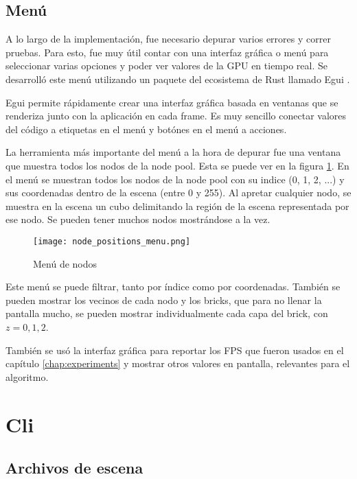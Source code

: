 
\subsection{Menú}

A lo largo de la implementación, fue necesario depurar varios errores y correr pruebas.
Para esto, fue muy útil contar con una interfaz gráfica o menú para seleccionar varias opciones y poder ver valores de la GPU en tiempo real.
Se desarrolló este menú utilizando un paquete del ecosistema de Rust llamado Egui \cite{egui}.

Egui permite rápidamente crear una interfaz gráfica basada en ventanas que se renderiza junto con la aplicación en cada frame.
Es muy sencillo conectar valores del código a etiquetas en el menú y botónes en el menú a acciones.

La herramienta más importante del menú a la hora de depurar fue una ventana que muestra todos los nodos de la node pool.
Esta se puede ver en la figura \ref{fig:node_positions_menu}.
En el menú se muestran todos los nodos de la node pool con su indice (0, 1, 2, ...) y sus coordenadas dentro de la escena (entre 0 y 255).
Al apretar cualquier nodo, se muestra en la escena un cubo delimitando la región de la escena representada por ese nodo.
Se pueden tener muchos nodos mostrándose a la vez.

\begin{figure}
    \centering
    \texttt{[image: node\_positions\_menu.png]}
    \caption{Menú de nodos}
    \label{fig:node_positions_menu}
\end{figure}

Este menú se puede filtrar, tanto por índice como por coordenadas.
También se pueden mostrar los vecinos de cada nodo y los bricks, que para no llenar la pantalla mucho, se pueden mostrar individualmente cada capa del brick, con $z=0,1,2$.

También se usó la interfaz gráfica para reportar los FPS que fueron usados en el capítulo \ref{chap:experiments} y mostrar otros valores en pantalla, relevantes para el algoritmo.

\section{Cli}

\subsection{Archivos de escena}


